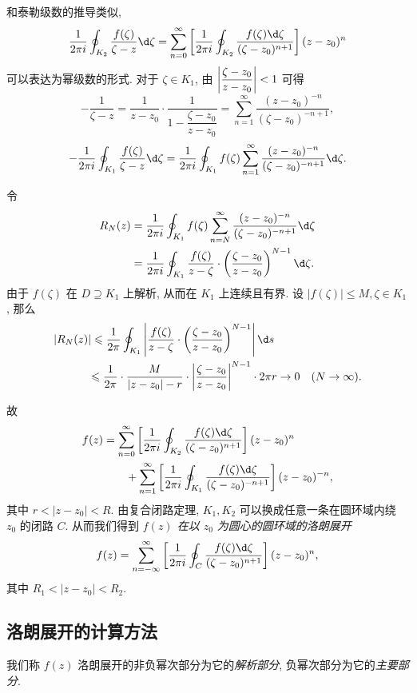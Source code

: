 和泰勒级数的推导类似,
	\[\frac1{2\pi i}\oint_{K_2}\frac{f(\zeta)}{\zeta-z}\d\zeta
	=\sum_{n=0}^\infty\left[\frac1{2\pi i}\oint_{K_2}\frac{f(\zeta)\d\zeta}{(\zeta-z_0)^{n+1}}\right](z-z_0)^n\]
可以表达为幂级数的形式.
对于 $\zeta\in K_1$, 由 $\left|\dfrac{\zeta-z_0}{z-z_0}\right|<1$ 可得
	\[-\frac1{\zeta-z}=\frac1{z-z_0}\cdot\frac1{1-\dfrac{\zeta-z_0}{z-z_0}}=\sum_{n=1}^\infty\frac{(z-z_0)^{-n}}{(\zeta-z_0)^{-n+1}},\]
	\[-\frac1{2\pi i}\oint_{K_1}\frac{f(\zeta)}{\zeta-z}\d\zeta=\frac1{2\pi i}\oint_{K_1}f(\zeta)\sum_{n=1}^\infty\frac{(z-z_0)^{-n}}{(\zeta-z_0)^{-n+1}}\d\zeta.\]

令
\begin{align*}
	R_N(z)&=\frac1{2\pi i}\oint_{K_1}f(\zeta)\sum_{n=N}^\infty\frac{(z-z_0)^{-n}}{(\zeta-z_0)^{-n+1}}\d\zeta\\
	&=\frac1{2\pi i}\oint_{K_1}\frac{f(\zeta)}{z-\zeta}\cdot\left(\frac{\zeta-z_0}{z-z_0}\right)^{N-1}\d\zeta.
\end{align*}
由于 $f(\zeta)$ 在 $D\supseteq K_1$ 上解析, 从而在 $K_1$ 上连续且有界.
设 $|f(\zeta)|\le M,\zeta\in K_1$,
那么
\begin{align*}
|R_N(z)|&\le\frac 1{2\pi}\oint_{K_1}\abs{\frac{f(\zeta)}{z-\zeta}\cdot\left(\frac{\zeta-z_0}{z-z_0}\right)^{N-1}}\d s\\
&{\le\frac 1{2\pi}\cdot\frac M{|z-z_0|-r}\cdot\abs{\frac{\zeta-z_0}{z-z_0}}^{N-1}\cdot 2\pi r\to 0\quad (N\to\infty).}
\end{align*}

故
\begin{align*}
f(z)&=\sum_{n=0}^\infty\left[\frac1{2\pi i}\oint_{K_2}\frac{f(\zeta)\d\zeta}{(\zeta-z_0)^{n+1}}\right](z-z_0)^n\\
&\qquad+\sum_{n=1}^\infty \left[\frac1{2\pi i}\oint_{K_1}\frac{f(\zeta)\d\zeta}{(\zeta-z_0)^{-n+1}}\right](z-z_0)^{-n},
\end{align*}
其中 $r<|z-z_0|<R$.
由复合闭路定理, $K_1,K_2$ 可以换成任意一条在圆环域内绕 $z_0$ 的闭路 $C$.
从而我们得到 \emph{$f(z)$ 在以 $z_0$ 为圆心的圆环域的洛朗展开}
	\[f(z)=\sum_{n=-\infty}^\infty\left[\frac1{2\pi i}\oint_C\frac{f(\zeta)\d\zeta}{(\zeta-z_0)^{n+1}}\right](z-z_0)^n,\]
其中 $R_1<|z-z_0|<R_2$.

\subsection{洛朗展开的计算方法}

我们称 $f(z)$ 洛朗展开的非负幂次部分为它的\emph{解析部分}, 负幂次部分为它的\emph{主要部分}.

